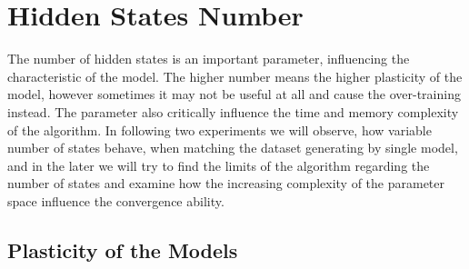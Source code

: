 \documentclass[thesis=M,english]{FITthesis}[2012/10/20]
\begin{document}
\section{Hidden States Number}\label{sec:hsn}

The number of hidden states is an important parameter, influencing the characteristic of the model. The higher number means the higher plasticity of the model, however sometimes it may not be useful at all and cause the over-training instead. The parameter also critically influence the time and memory complexity of the algorithm. In following two experiments we will observe, how variable number of states behave, when matching the dataset generating by single model, and in the later we will try to find the limits of the algorithm regarding the number of states and examine how the increasing complexity of the parameter space influence the convergence ability.    

\subsection{Plasticity of the Models}\label{sec:plast}
\end{document}
